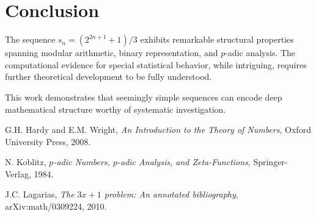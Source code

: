 \documentclass[11pt]{article}
\theoremstyle{remark}
\begin{document}
\section{Conclusion}

The sequence $s_n = (2^{2n+1} + 1)/3$ exhibits remarkable structural properties spanning modular arithmetic, binary representation, and $p$-adic analysis. The computational evidence for special statistical behavior, while intriguing, requires further theoretical development to be fully understood.

This work demonstrates that seemingly simple sequences can encode deep mathematical structure worthy of systematic investigation.

\begin{thebibliography}{9}
G.H. Hardy and E.M. Wright, \emph{An Introduction to the Theory of Numbers}, Oxford University Press, 2008.

N. Koblitz, \emph{$p$-adic Numbers, $p$-adic Analysis, and Zeta-Functions}, Springer-Verlag, 1984.

J.C. Lagarias, \emph{The $3x+1$ problem: An annotated bibliography}, arXiv:math/0309224, 2010.
\end{thebibliography}
\end{document}

